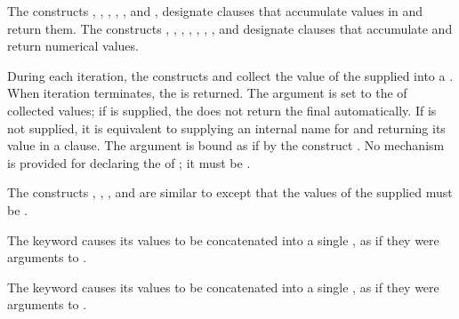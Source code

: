 The constructs , 
, , , 
, and , 
designate clauses that
accumulate values in  and return them.
The constructs , , 
, , , ,
, and  designate clauses that accumulate and
return numerical values.

During each iteration,  the constructs
 and 
collect the value of the supplied
 into a . 
When iteration terminates, the  is returned.
The argument  is 
set to the  
of collected values; if  is supplied, the 
does not return the final  automatically.  If 
 is not
supplied, it is equivalent to supplying an internal name for
 and returning its value in a  clause.
The  argument
is bound as if by the construct .
No mechanism is provided for declaring the  of ;
it must be .
 


The constructs , , 
, and  
are similar to  except that the
values of the supplied  must be .  
 
\beginlist
\itemitem{\bull}
The  keyword causes its  values to be concatenated 
into a single , as if 
they were arguments to .
 
\itemitem{\bull}
The  keyword causes its  values to be concatenated
into a single ,
as if they were arguments to .  
\endlist
 
